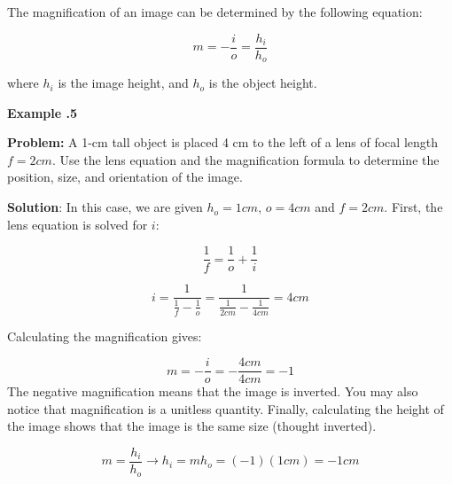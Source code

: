  The magnification of an image can be determined by the following equation:
 	\begin{mdframed}[backgroundcolor=orange!20!white]
 	
 	\begin{equation}
 	m = - \frac{i}{o} = \frac{h_i}{h_o}
 	\label{equation:magnification}
 	\end{equation}
 \end{mdframed}
 
 where $h_i$ is the image height, and $h_o$ is the object height.  
 
 
 
 \begin{mdframed}[backgroundcolor=blue!10!white]
 	\begin{center}	
 		\textbf{Example \thesection.5}	
 	\end{center}
 	
 	\textbf{Problem:} A 1-cm tall object is placed 4 cm to the left of a lens of focal length $f=2 \si{cm}$.  Use the lens equation and the magnification formula to determine the position, size, and orientation of the image.  
 	
 	\textbf{Solution}: In this case, we are given $h_o = 1 \si{cm}$, $o = 4 \si{cm}$ and $f = 2 \si{cm}$.  First, the lens equation is solved for $i$:
 	
 	\begin{equation*}
 	\frac{1}{f} = \frac{1}{o} + \frac{1}{i}  
 	\end{equation*}
 	
 	
 	\begin{equation*}
 	i = \frac{1}{\frac{1}{f}-\frac{1}{o}} = \frac{1}{\frac{1}{2\si{cm}}-\frac{1}{4\si{cm}}} = \boxed{4 \si{cm}}
 	\end{equation*}
 
 	
 	Calculating the magnification gives: 
 	
 	\begin{equation*}
 	m = - \frac{i}{o} = -\frac{4\si{cm}}{4\si{cm}} = \boxed{-1}
 	\end{equation*}
 	The negative magnification means that the image is inverted.  You may also notice that magnification is a unitless quantity.  Finally, calculating the height of the image shows that the image is the same size (thought inverted).  
 	
 	\begin{equation*}
 	m = \frac{h_i}{h_o} \longrightarrow h_i = m h_o = (-1)(1 \si{cm}) = \boxed{-1 \si{cm}}
 	\end{equation*}
 	
 	
 	
 \end{mdframed}
 


